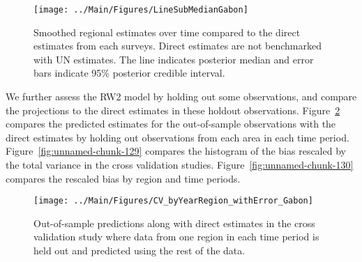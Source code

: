 \documentclass[12pt]{article}\usepackage[]{graphicx}\usepackage[]{color}
\newenvironment{knitrout}{}{} %
\begin{document}
\begin{knitrout}
\color{fgcolor}\begin{figure}[bht]

{\centering \texttt{[image: ../Main/Figures/LineSubMedianGabon]} 

}

\caption[Smoothed regional estimates over time compared to the direct estimates from each surveys]{Smoothed regional estimates over time compared to the direct estimates from each surveys. Direct estimates are not benchmarked with UN estimates. The line indicates posterior median and error bars indicate 95\% posterior credible interval.}\label{fig:unnamed-chunk-127}
\end{figure}


\end{knitrout}
We further assess the RW2 model by holding out some observations, and compare the projections to the direct estimates in these holdout observations. Figure~\ref{fig:unnamed-chunk-128} compares the predicted estimates for the out-of-sample observations  with the direct estimates by holding out observations from each area in each time period.  Figure~\ref{fig:unnamed-chunk-129} compares the histogram of the bias rescaled by the total variance in the cross validation studies. Figure~\ref{fig:unnamed-chunk-130} compares the rescaled bias by region and time periods.



 
\begin{knitrout}
\color{fgcolor}\begin{figure}[bht]

{\centering \texttt{[image: ../Main/Figures/CV\_byYearRegion\_withError\_Gabon]} 

}

\caption[Out-of-sample predictions along with direct estimates in the cross validation study where data from one region in each time period is held out and predicted using the rest of the data]{Out-of-sample predictions along with direct estimates in the cross validation study where data from one region in each time period is held out and predicted using the rest of the data.}\label{fig:unnamed-chunk-128}
\end{figure}


\end{knitrout}
\end{document}

